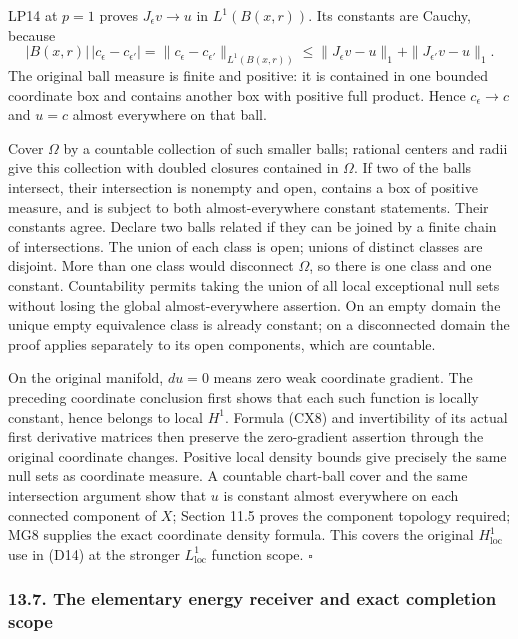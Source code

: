\documentclass[
  11pt,
]{article}
\begin{document}
LP14 at \(p=1\) proves \(J_\epsilon v\to u\) in \(L^1(B(x,r))\). Its
constants are Cauchy, because \[
 |B(x,r)|\,|c_\epsilon-c_{\epsilon'}|
       =\|c_\epsilon-c_{\epsilon'}\|_{L^1(B(x,r))}
       \leq\|J_\epsilon v-u\|_1+
                         \|J_{\epsilon'}v-u\|_1 .              \tag{HS21}
\] The original ball measure is finite and positive: it is contained in
one bounded coordinate box and contains another box with positive full
product. Hence \(c_\epsilon\to c\) and \(u=c\) almost everywhere on that
ball.

Cover \(\Omega\) by a countable collection of such smaller balls;
rational centers and radii give this collection with doubled closures
contained in \(\Omega\). If two of the balls intersect, their
intersection is nonempty and open, contains a box of positive measure,
and is subject to both almost-everywhere constant statements. Their
constants agree. Declare two balls related if they can be joined by a
finite chain of intersections. The union of each class is open; unions
of distinct classes are disjoint. More than one class would disconnect
\(\Omega\), so there is one class and one constant. Countability permits
taking the union of all local exceptional null sets without losing the
global almost-everywhere assertion. On an empty domain the unique empty
equivalence class is already constant; on a disconnected domain the
proof applies separately to its open components, which are countable.

On the original manifold, \(du=0\) means zero weak coordinate gradient.
The preceding coordinate conclusion first shows that each such function
is locally constant, hence belongs to local \(H^1\). Formula (CX8) and
invertibility of its actual first derivative matrices then preserve the
zero-gradient assertion through the original coordinate changes.
Positive local density bounds give precisely the same null sets as
coordinate measure. A countable chart-ball cover and the same
intersection argument show that \(u\) is constant almost everywhere on
each connected component of \(X\); Section 11.5 proves the component
topology required; MG8 supplies the exact coordinate density formula.
This covers the original \(H^1_{\mathrm{loc}}\) use in (D14) at the
stronger \(L^1_{\mathrm{loc}}\) function scope. \(\square\)

\subsubsection{13.7. The elementary energy receiver and exact completion
scope}\label{the-elementary-energy-receiver-and-exact-completion-scope}
\end{document}
